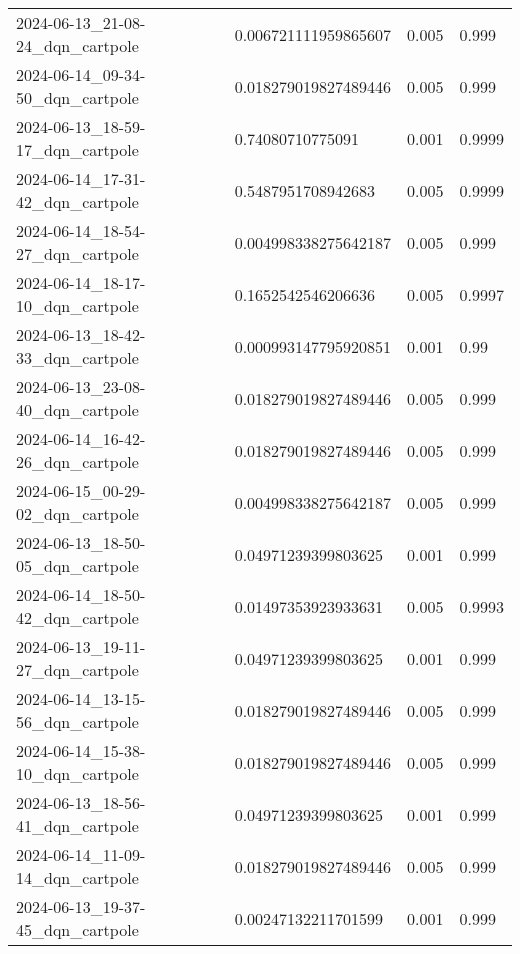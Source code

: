 \documentclass[a4paper,12pt]{article}
\begin{document}
\begin{center}
{\begin{tabular}{llll}
            2024-06-13\_21-08-24\_dqn\_cartpole & 0.006721111959865607 & 0.005        & 0.999          \\
            2024-06-14\_09-34-50\_dqn\_cartpole & 0.018279019827489446 & 0.005        & 0.999          \\
            2024-06-13\_18-59-17\_dqn\_cartpole & 0.74080710775091     & 0.001        & 0.9999         \\
            2024-06-14\_17-31-42\_dqn\_cartpole & 0.5487951708942683   & 0.005        & 0.9999         \\
            2024-06-14\_18-54-27\_dqn\_cartpole & 0.004998338275642187 & 0.005        & 0.999          \\
            2024-06-14\_18-17-10\_dqn\_cartpole & 0.1652542546206636   & 0.005        & 0.9997         \\
            2024-06-13\_18-42-33\_dqn\_cartpole & 0.000993147795920851 & 0.001        & 0.99           \\
            2024-06-13\_23-08-40\_dqn\_cartpole & 0.018279019827489446 & 0.005        & 0.999          \\
            2024-06-14\_16-42-26\_dqn\_cartpole & 0.018279019827489446 & 0.005        & 0.999          \\
            2024-06-15\_00-29-02\_dqn\_cartpole & 0.004998338275642187 & 0.005        & 0.999          \\
            2024-06-13\_18-50-05\_dqn\_cartpole & 0.04971239399803625  & 0.001        & 0.999          \\
            2024-06-14\_18-50-42\_dqn\_cartpole & 0.01497353923933631  & 0.005        & 0.9993         \\
            2024-06-13\_19-11-27\_dqn\_cartpole & 0.04971239399803625  & 0.001        & 0.999          \\
            2024-06-14\_13-15-56\_dqn\_cartpole & 0.018279019827489446 & 0.005        & 0.999          \\
            2024-06-14\_15-38-10\_dqn\_cartpole & 0.018279019827489446 & 0.005        & 0.999          \\
            2024-06-13\_18-56-41\_dqn\_cartpole & 0.04971239399803625  & 0.001        & 0.999          \\
            2024-06-14\_11-09-14\_dqn\_cartpole & 0.018279019827489446 & 0.005        & 0.999          \\
            2024-06-13\_19-37-45\_dqn\_cartpole & 0.00247132211701599  & 0.001        & 0.999          \\

\end{tabular}}
\end{center}
\end{document}
